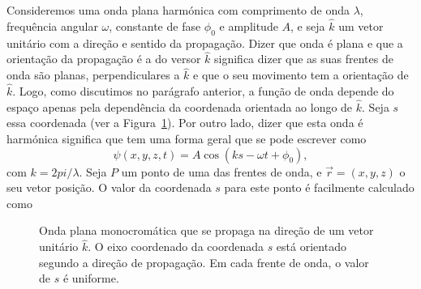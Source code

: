 Consideremos uma onda plana harmónica com comprimento de onda $\lambda$,
frequência angular $\omega$, constante de fase $\phi_0$ e amplitude $A$, e seja
$\hat k$ um vetor unitário com a direção e sentido da propagação. Dizer que
onda é plana e que a orientação da propagação é a do versor $\hat k$ significa
dizer que as suas frentes de onda são planas, perpendiculares a $\hat k$ e que
o seu movimento tem a orientação de $\hat k$. Logo, como discutimos no parágrafo
anterior, a função de onda depende do espaço apenas pela dependência da
coordenada orientada ao longo de $\hat k$. Seja $s$ essa coordenada (ver a
Figura~\ref{fig:f050}).  Por outro lado, dizer que esta onda é harmónica
significa que tem uma forma geral que se pode escrever como
\begin{equation}\label{eq:eq0}
  \psi(x,y,z,t)=A\cos\left(ks-\omega t+\phi_0\right),
\end{equation}
com $k=2pi/\lambda$. Seja $P$ um ponto de uma das frentes de onda, e
$\vec r=(x,y,z)$ o seu vetor posição. O valor da coordenada $s$ para este ponto
é facilmente calculado como
\begin{figure}[htb]
  {\centering
    \par
  }
  \caption{\label{fig:f050}Onda plana monocromática que se propaga na direção de
    um vetor unitário $\hat k$. O eixo coordenado da coordenada $s$ está
    orientado segundo a direção de propagação. Em cada frente de onda, o valor
  de $s$ é uniforme.}
\end{figure}
